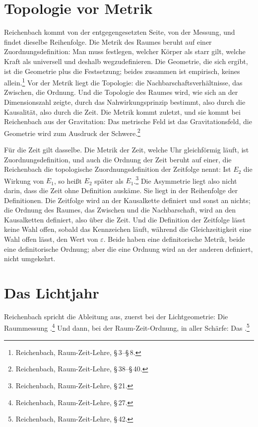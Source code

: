 \section{Topologie vor Metrik}

Reichenbach kommt von der entgegengesetzten Seite, von der Messung, und findet dieselbe Reihenfolge. Die Metrik des Raumes beruht auf einer Zuordnungsdefinition: Man muss festlegen, welcher Körper als starr gilt, welche Kraft als universell und deshalb wegzudefinieren. Die Geometrie, die sich ergibt, ist die Geometrie plus die Festsetzung; beides zusammen ist empirisch, keines allein.\footnote{Reichenbach, Raum-Zeit-Lehre, \S\,3--\S\,8.} Vor der Metrik liegt die Topologie: die Nachbarschaftsverhältnisse, das Zwischen, die Ordnung. Und die Topologie des Raumes wird, wie sich an der Dimensionszahl zeigte, durch das Nahwirkungsprinzip bestimmt, also durch die Kausalität, also durch die Zeit. Die Metrik kommt zuletzt, und sie kommt bei Reichenbach aus der Gravitation: Das metrische Feld ist das Gravitationsfeld, die Geometrie wird zum Ausdruck der Schwere.\footnote{Reichenbach, Raum-Zeit-Lehre, \S\,38--\S\,40.}

Für die Zeit gilt dasselbe. Die Metrik der Zeit, welche Uhr gleichförmig läuft, ist Zuordnungsdefinition, und auch die Ordnung der Zeit beruht auf einer, die Reichenbach die topologische Zuordnungsdefinition der Zeitfolge nennt: Ist $E_2$ die Wirkung von $E_1$, so heißt $E_2$ später als $E_1$.\footnote{Reichenbach, Raum-Zeit-Lehre, \S\,21.} Die Asymmetrie liegt also nicht darin, dass die Zeit ohne Definition auskäme. Sie liegt in der Reihenfolge der Definitionen. Die Zeitfolge wird an der Kausalkette definiert und sonst an nichts; die Ordnung des Raumes, das Zwischen und die Nachbarschaft, wird an den Kausalketten definiert, also über die Zeit. Und die Definition der Zeitfolge lässt keine Wahl offen, sobald das Kennzeichen läuft, während die Gleichzeitigkeit eine Wahl offen lässt, den Wert von $\varepsilon$. Beide haben eine definitorische Metrik, beide eine definitorische Ordnung; aber die eine Ordnung wird an der anderen definiert, nicht umgekehrt.

\section{Das Lichtjahr}

Reichenbach spricht die Ableitung aus, zuerst bei der Lichtgeometrie: Die Raummessung .\footnote{Reichenbach, Raum-Zeit-Lehre, \S\,27.} Und dann, bei der Raum-Zeit-Ordnung, in aller Schärfe: Das .\footnote{Reichenbach, Raum-Zeit-Lehre, \S\,42.}

